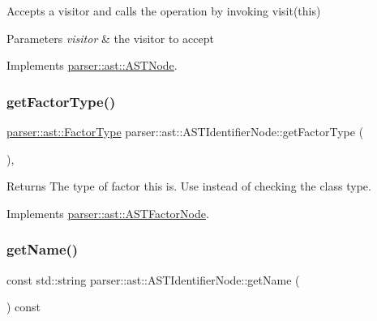 Accepts a visitor and calls the operation by invoking {\ttfamily visit(this)} 
\begin{DoxyParams}{Parameters}
{\em visitor} & the visitor to accept \\
\hline
\end{DoxyParams}


Implements \hyperlink{classparser_1_1ast_1_1ASTNode_a3ff84fdfdbbc5c39b70b4d04c22e7dc3}{parser\+::ast\+::\+A\+S\+T\+Node}.

\mbox{\label{classparser_1_1ast_1_1ASTIdentifierNode_a7b759817af29784741596a4387b6547f}} 
\subsubsection{\texorpdfstring{get\+Factor\+Type()}{getFactorType()}}
{\footnotesize\ttfamily \hyperlink{ASTFactorNode_8h_afbe2fcc03ef15b74a0c1ed1cda7ab0e8}{parser\+::ast\+::\+Factor\+Type} parser\+::ast\+::\+A\+S\+T\+Identifier\+Node\+::get\+Factor\+Type (\begin{DoxyParamCaption}{ }\end{DoxyParamCaption})\hspace{0.3cm}{\ttfamily [override]}, {\ttfamily [virtual]}}

\begin{DoxyReturn}{Returns}
The type of factor this is. Use instead of checking the class type. 
\end{DoxyReturn}


Implements \hyperlink{classparser_1_1ast_1_1ASTFactorNode_a13eea7f949c0055dea0a9d7b715f16a8}{parser\+::ast\+::\+A\+S\+T\+Factor\+Node}.

\mbox{\label{classparser_1_1ast_1_1ASTIdentifierNode_adcb3da6c49adf6341e9a477458cc5998}} 
\subsubsection{\texorpdfstring{get\+Name()}{getName()}}
{\footnotesize\ttfamily const std\+::string parser\+::ast\+::\+A\+S\+T\+Identifier\+Node\+::get\+Name (\begin{DoxyParamCaption}{ }\end{DoxyParamCaption}) const}

